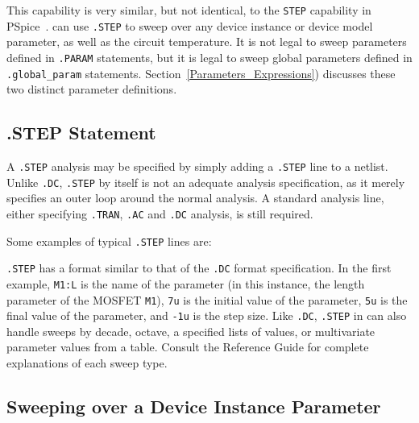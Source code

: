 This capability is very similar, but not identical, to the \verb|STEP| capability in 
PSpice~\cite{PSpiceUG:1998}.  
\Xyce{}  can use \verb|.STEP| to sweep over any device instance or device
model parameter, as well as the circuit temperature.  It is not legal to sweep parameters defined in \texttt{.PARAM} statements, but it is legal to sweep global parameters defined in \texttt{.global\_param} statements.  Section~\ref{Parameters_Expressions}) discusses these two distinct parameter definitions.

\subsection{.STEP Statement}

A \verb|.STEP| analysis may be specified by simply adding a \verb|.STEP| line to a netlist.  Unlike \verb|.DC|, \verb|.STEP| by itself is not an adequate analysis specification, as it merely specifies an outer loop around the normal analysis.  A standard analysis line, either specifying \verb|.TRAN|, \verb|.AC| and \verb|.DC| analysis, is still required.

Some examples of typical \verb|.STEP| lines are:


\verb|.STEP| has a format similar to that of the \verb|.DC| format
specification.  In the first example, \verb|M1:L| is the name of the
parameter (in this instance, the length parameter of the MOSFET
\texttt{M1}), \verb|7u| is the initial value of the parameter,
\verb|5u| is the final value of the parameter, and \verb|-1u| is the
step size.  Like \verb|.DC|, \verb|.STEP| in \Xyce{} can also handle
sweeps by decade, octave, a specified lists of values, or multivariate parameter values from a table.  Consult the
\Xyce{} Reference Guide\ReferenceGuide{} for complete explanations of each sweep type.

\subsection{Sweeping over a Device Instance Parameter}
\label{step_InstanceParam}

